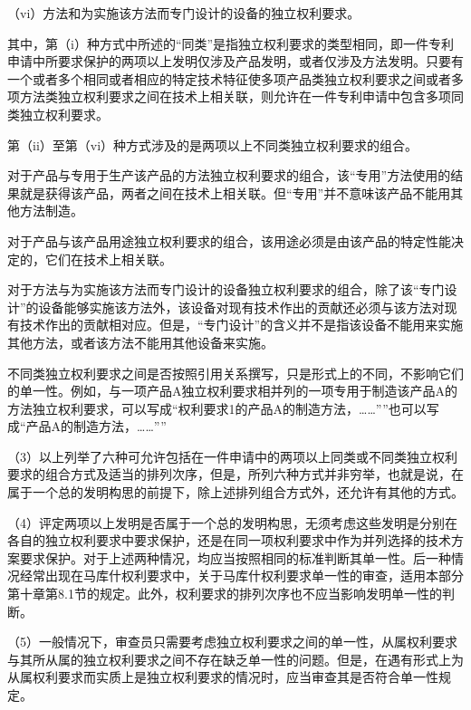 {\setlength{\parindent}{17.1bp}（vi）方法和为实施该方法而专门设计的设备的独立权利要求。\par}

其中，第（i）种方式中所述的“同类”是指独立权利要求的类型相同，即一件专利申请中所要求保护的两项以上发明仅涉及产品发明，或者仅涉及方法发明。只要有一个或者多个相同或者相应的特定技术特征使多项产品类独立权利要求之间或者多项方法类独立权利要求之间在技术上相关联，则允许在一件专利申请中包含多项同类独立权利要求。

第（ii）至第（vi）种方式涉及的是两项以上不同类独立权利要求的组合。

对于产品与专用于生产该产品的方法独立权利要求的组合，该“专用”方法使用的结果就是获得该产品，两者之间在技术上相关联。但“专用”并不意味该产品不能用其他方法制造。

对于产品与该产品用途独立权利要求的组合，该用途必须是由该产品的特定性能决定的，它们在技术上相关联。

对于方法与为实施该方法而专门设计的设备独立权利要求的组合，除了该“专门设计”的设备能够实施该方法外，该设备对现有技术作出的贡献还必须与该方法对现有技术作出的贡献相对应。但是，“专门设计”的含义并不是指该设备不能用来实施其他方法，或者该方法不能用其他设备来实施。

不同类独立权利要求之间是否按照引用关系撰写，只是形式上的不同，不影响它们的单一性。例如，与一项产品A独立权利要求相并列的一项专用于制造该产品A的方法独立权利要求，可以写成“权利要求1的产品A的制造方法，……””也可以写成“产品A的制造方法，……””

{\setlength{\parindent}{17.1bp}（3）以上列举了六种可允许包括在一件申请中的两项以上同类或不同类独立权利要求的组合方式及适当的排列次序，但是，所列六种方式并非穷举，也就是说，在属于一个总的发明构思的前提下，除上述排列组合方式外，还允许有其他的方式。\par}

{\setlength{\parindent}{17.1bp}（4）评定两项以上发明是否属于一个总的发明构思，无须考虑这些发明是分别在各自的独立权利要求中要求保护，还是在同一项权利要求中作为并列选择的技术方案要求保护。对于上述两种情况，均应当按照相同的标准判断其单一性。后一种情况经常出现在马库什权利要求中，关于马库什权利要求单一性的审查，适用本部分第十章第8.1节的规定。此外，权利要求的排列次序也不应当影响发明单一性的判断。\par}

{\setlength{\parindent}{17.1bp}（5）一般情况下，审查员只需要考虑独立权利要求之间的单一性，从属权利要求与其所从属的独立权利要求之间不存在缺乏单一性的问题。但是，在遇有形式上为从属权利要求而实质上是独立权利要求的情况时，应当审查其是否符合单一性规定。\par}

